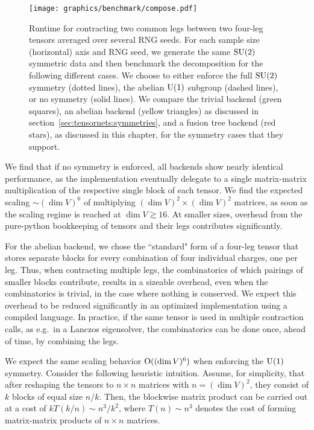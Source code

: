 \begin{figure}[ht]
    \centering
    \texttt{[image: graphics/benchmark/compose.pdf]}
    \caption[Runtime benchmark for contraction, comparing tensor backends]{
        Runtime for contracting two common legs between two four-leg tensors averaged over several RNG seeds.
        For each sample size (horizontal) axis and RNG seed, we generate the same $\mathrm{SU}(2)$ symmetric data and then benchmark the decomposition for the following different cases.
        We choose to either enforce the full $\mathrm{SU}(2)$ symmetry (dotted lines), the abelian $\mathrm{U}(1)$ subgroup (dashed lines), or no symmetry (solid lines).
        We compare the trivial backend (green squares), an abelian backend (yellow triangles) as discussed in section~\ref{sec:tensornets:symmetries}, and a fusion tree backend (red stars), as discussed in this chapter, for the symmetry cases that they support.
    }
    \label{fig:nonabelian:benchmark:compose}
\end{figure}

We find that if no symmetry is enforced, all backends show nearly identical performance, as the implementation eventually delegate to a single matrix-matrix multiplication of the respective single block of each tensor.
%
We find the expected scaling $\sim (\dim V)^6$ of multiplying $(\dim V)^2 \times (\dim V)^2$ matrices, as soon as the scaling regime is reached at $\dim V \gtrsim 16$.
%
At smaller sizes, overhead from the pure-python bookkeeping of tensors and their legs contributes significantly.

For the abelian backend, we chose the ``standard" form of a four-leg tensor that stores separate blocks for every combination of four individual charges, one per leg.
%
Thus, when contracting multiple legs, the combinatorics of which pairings of smaller blocks contribute, results in a sizeable overhead, even when the combinatorics is trivial, in the case where nothing is conserved.
%
We expect this overhead to be reduced significantly in an optimized implementation using a compiled language.
%
In practice, if the same tensor is used in multiple contraction calls, as e.g.~in a Lanczos eigensolver, the combinatorics can be done once, ahead of time, by combining the legs.

We expect the same scaling behavior $\mathrm{O}((\dim V)^6)$ when enforcing the $\mathrm{U}(1)$ symmetry.
%
Consider the following heuristic intuition.
%
Assume, for simplicity, that after reshaping the tensors to $n \times n$ matrices with $n = (\dim V)^2$, they consist of $k$ blocks of equal size $n / k$.
%
Then, the blockwise matrix product can be carried out at a cost of $k T( k / n ) \sim n^3 / k^2$, where $T(n) \sim n^3$ denotes the cost of forming matrix-matrix products of $n \times n$ matrices.


